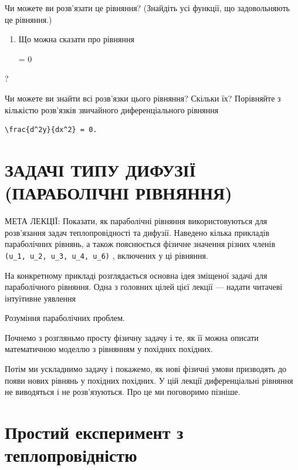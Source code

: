 \documentclass[
  ukrainian,
]{article}
\begin{document}
Чи можете ви розв'язати це рівняння? (Знайдіть усі функції, що
задовольняють це рівняння.)

\begin{enumerate}
\def\labelenumi{\arabic{enumi}.}
\setcounter{enumi}{4}
\item
  Що можна сказати про рівняння

   = 0
\end{enumerate}

?

Чи можете ви знайти всі розв'язки цього рівняння? Скільки їх? Порівняйте
з кількістю розв'язків звичайного диференціального рівняння

\begin{verbatim}
\frac{d^2y}{dx^2} = 0.
\end{verbatim}

\section{ЗАДАЧІ ТИПУ ДИФУЗІЇ (ПАРАБОЛІЧНІ
РІВНЯННЯ)}\label{ux437ux430ux434ux430ux447ux456-ux442ux438ux43fux443-ux434ux438ux444ux443ux437ux456ux457-ux43fux430ux440ux430ux431ux43eux43bux456ux447ux43dux456-ux440ux456ux432ux43dux44fux43dux43dux44f}

МЕТА ЛЕКЦІЇ: Показати, як параболічні рівняння використовуються для
розв'язання задач теплопровідності та дифузії. Наведено кілька прикладів
параболічних рівнянь, а також пояснюється фізичне значення різних членів
\texttt{(u\_1,\ u\_2,\ u\_3,\ u\_4,\ u\_6)} , включених у ці рівняння.

На конкретному прикладі розглядається основна ідея зміщеної задачі для
параболічного рівняння. Одна з головних цілей цієї лекції --- надати
читачеві інтуїтивне уявлення

Розуміння параболічних проблем.

Почнемо з розгляньмо просту фізичну задачу і те, як її можна описати
математичною моделлю з рівнянням у похідних похідних.

Потім ми ускладнимо задачу і покажемо, як нові фізичні умови призводять
до появи нових рівнянь у похідних похідних. У цій лекції диференціальні
рівняння не виводяться і не розв'язуються. Про це ми поговоримо пізніше.

\section{Простий експеримент з
теплопровідністю}\label{ux43fux440ux43eux441ux442ux438ux439-ux435ux43aux441ux43fux435ux440ux438ux43cux435ux43dux442-ux437-ux442ux435ux43fux43bux43eux43fux440ux43eux432ux456ux434ux43dux456ux441ux442ux44e}
\end{document}
